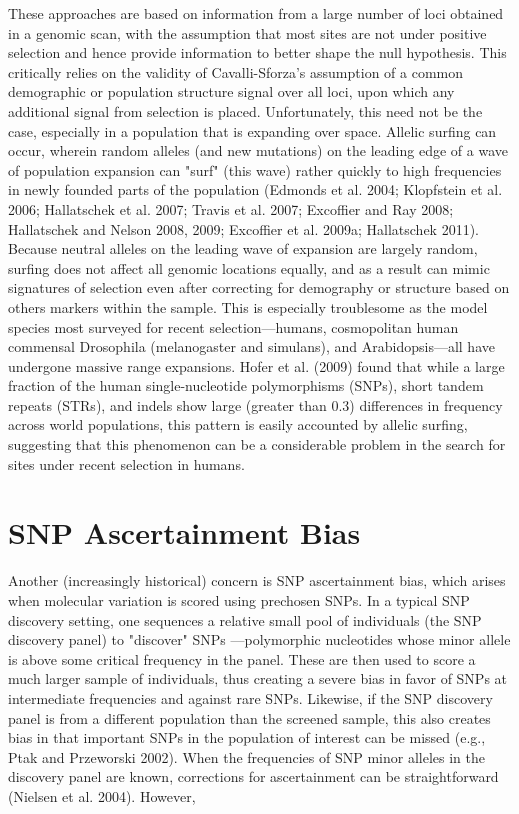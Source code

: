 \documentclass{article}
\begin{document}
These approaches are based on information from a large number of loci obtained in a genomic scan, with the assumption that most sites are not under positive selection and hence provide information to better shape the null hypothesis. This critically relies on the validity of Cavalli-Sforza's assumption of a common demographic or population structure signal over all loci, upon which any additional signal from selection is placed. Unfortunately, this need not be the case, especially in a population that is expanding over space. Allelic surfing can occur, wherein random alleles (and new mutations) on the leading edge of a wave of population expansion can "surf" (this wave) rather quickly to high frequencies in newly founded parts of the population (Edmonds et al. 2004; Klopfstein et al. 2006; Hallatschek et al. 2007; Travis et al. 2007; Excoffier and Ray 2008; Hallatschek and Nelson 2008, 2009; Excoffier et al. 2009a; Hallatschek 2011). Because neutral alleles on the leading wave of expansion are largely random, surfing does not affect all genomic locations equally, and as a result can mimic signatures of selection even after correcting for demography or structure based on others markers within the sample. This is especially troublesome as the model species most surveyed for recent selection—humans, cosmopolitan human commensal Drosophila (melanogaster and simulans), and Arabidopsis—all have undergone massive range expansions. Hofer et al. (2009) found that while a large fraction of the human single-nucleotide polymorphisms (SNPs), short tandem repeats (STRs), and indels show large (greater than 0.3) differences in frequency across world populations, this pattern is easily accounted by allelic surfing, suggesting that this phenomenon can be a considerable problem in the search for sites under recent selection in humans.

\section{SNP Ascertainment Bias}
Another (increasingly historical) concern is SNP ascertainment bias, which arises when molecular variation is scored using prechosen SNPs. In a typical SNP discovery setting, one sequences a relative small pool of individuals (the SNP discovery panel) to "discover" SNPs —polymorphic nucleotides whose minor allele is above some critical frequency in the panel. These are then used to score a much larger sample of individuals, thus creating a severe bias in favor of SNPs at intermediate frequencies and against rare SNPs. Likewise, if the SNP discovery panel is from a different population than the screened sample, this also creates bias in that important SNPs in the population of interest can be missed (e.g., Ptak and Przeworski 2002). When the frequencies of SNP minor alleles in the discovery panel are known, corrections for ascertainment can be straightforward (Nielsen et al. 2004). However,
\end{document}
